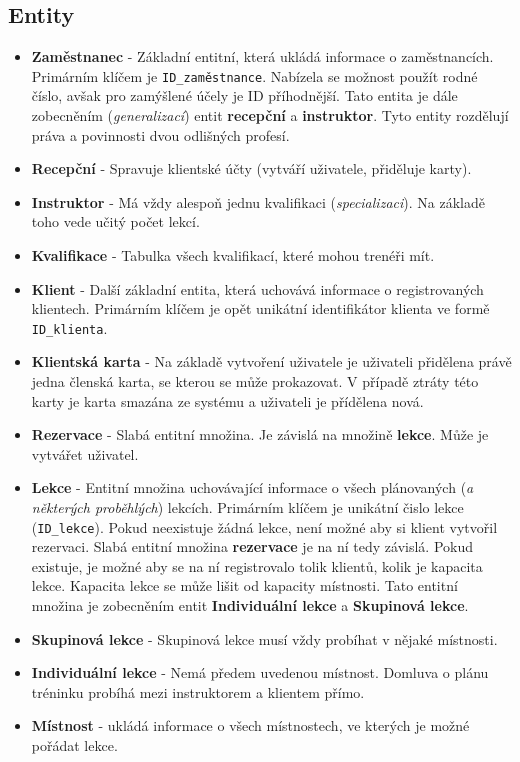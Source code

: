 \documentclass[10pt,a4paper]{article}
\begin{document}
\subsection{Entity}
\begin{itemize}
	\item \textbf{Zaměstnanec} - Základní entitní, která ukládá informace o zaměstnancích. Primárním klíčem je \texttt{ID\_zaměstnance}. Nabízela se možnost použít rodné číslo, avšak pro zamýšlené účely je ID příhodnější. Tato entita je dále zobecněním (\textit{generalizací}) entit \textbf{recepční} a \textbf{instruktor}. Tyto entity rozdělují práva a povinnosti dvou odlišných profesí.
	\item \textbf{Recepční} - Spravuje klientské účty (vytváří uživatele, přiděluje karty).
	\item \textbf{Instruktor} - Má vždy alespoň jednu kvalifikaci (\textit{specializaci}). Na základě toho vede učitý počet lekcí.
	\item \textbf{Kvalifikace} - Tabulka všech kvalifikací, které mohou trenéři mít.
	\item \textbf{Klient} - Další základní entita, která uchovává informace o registrovaných klientech. Primárním klíčem je opět unikátní identifikátor klienta ve formě \texttt{ID\_klienta}. 
	\item \textbf{Klientská karta} - Na základě vytvoření uživatele je uživateli přidělena právě jedna členská karta, se kterou se může prokazovat. V případě ztráty této karty je karta smazána ze systému a uživateli je přídělena nová.
	\item \textbf{Rezervace} - Slabá entitní množina. Je závislá na množině \textbf{lekce}. Může je vytvářet uživatel.
	\item \textbf{Lekce} - Entitní množina uchovávající informace o všech plánovaných (\textit{a některých proběhlých}) lekcích. Primárním klíčem je unikátní čislo lekce (\texttt{ID\_lekce}). Pokud neexistuje žádná lekce, není možné aby si klient vytvořil rezervaci. Slabá entitní množina \textbf{rezervace} je na ní tedy závislá. Pokud existuje, je možné aby se na ní registrovalo tolik klientů, kolik je kapacita lekce. Kapacita lekce se může lišit od kapacity místnosti. Tato entitní množina je zobecněním entit \textbf{Individuální lekce} a \textbf{Skupinová lekce}. 
	\item \textbf{Skupinová lekce} - Skupinová lekce musí vždy probíhat v nějaké místnosti.
	\item \textbf{Individuální lekce} - Nemá předem uvedenou místnost. Domluva o plánu tréninku probíhá mezi instruktorem a klientem přímo.
	\item \textbf{Místnost} - ukládá informace o všech místnostech, ve kterých je možné pořádat lekce.
\end{itemize}
\end{document}
